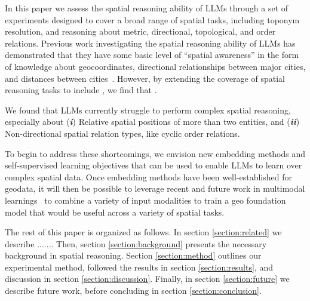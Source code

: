 In this paper we assess the spatial reasoning ability of LLMs through a set of experiments designed to cover a broad range of spatial tasks, including toponym resolution, and reasoning about metric, directional, topological, and order relations.
Previous work investigating the spatial reasoning ability of LLMs has demonstrated that they have some basic level of ``spatial awareness'' in the form of knowledge about geocoordinates, directional relationships between major cities, and distances between cities~\cite{Bhandari2023, Qi2023}.
However, by extending the coverage of spatial reasoning tasks to include , we find that .




We found that LLMs currently struggle to perform complex spatial reasoning, especially about
%
(\textit{\textbf{i}}) Relative spatial positions of more than two entities, and 
(\textit{\textbf{ii}}) Non-directional spatial relation types, like cyclic order relations.



To begin to address these shortcomings, we envision new embedding methods and self-supervised learning objectives that can be used to enable LLMs to learn over complex spatial data.
Once embedding methods have been well-established for geodata, it will then be possible to leverage recent and future work in multimodal learnings~\cite{Xue2023, Trappolini2023} to combine a variety of input modalities to train a geo foundation model that would be useful across a variety of spatial tasks.


The rest of this paper is organized as follows.
In section \ref{section:related} we describe .......
Then, section \ref{section:background} presents the necessary background in spatial reasoning.
Section \ref{section:method} outlines our experimental method, followed the results in section \ref{section:results}, and discussion in section \ref{section:discussion}.
Finally, in section \ref{section:future} we describe future work, before concluding in section \ref{section:conclusion}. 



